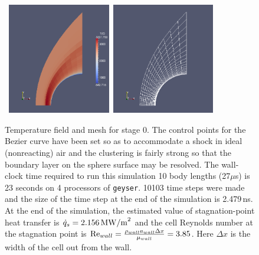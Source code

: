 \begin{figure}[htbp]
\begin{center}
\mbox{
\includegraphics[width=0.4\textwidth]{../2D/sphere-heat-transfer/sphere0-T-field.png}
\includegraphics[width=0.4\textwidth]{../2D/sphere-heat-transfer/sphere0-mesh.png}
}
\end{center}
\caption{Temperature field and mesh for stage 0.  
  The control points for the Bezier curve have been set so as to accommodate 
  a shock in ideal (nonreacting) air and the clustering is fairly strong so that
  the boundary layer on the sphere surface may be resolved.
  The wall-clock time required to run this simulation 10 body lengths (27$\mu$s) is 23 seconds 
  on 4 processors of \texttt{geyser}.
  10103 time steps were made and the size of the time step at the end of the simulation is 2.479\,ns.
  At the end of the simulation, the estimated value of stagnation-point heat transfer is
  $\dot{q}_s=2.156\,{\rm MW/m}^2$ and the cell Reynolds number at the stagnation point is
  ${\rm Re}_{wall} = {{\rho_{wall} a_{wall} \Delta x} \over {\mu_{wall}}} = 3.85$.
  Here $\Delta x$ is the width of the cell out from the wall.}
\label{sphere-heat-transfer-stage-0-fig}
\end{figure}

